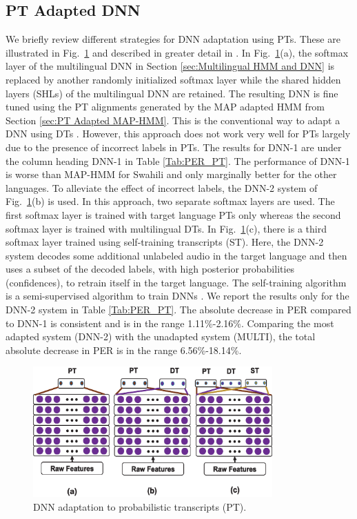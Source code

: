 \documentclass[a4paper]{article}
\newcommand{\myvspacefig}{\vspace{-4mm}}
\begin{document}
\subsection{PT Adapted DNN}
\label{sec:PT Adapted DNN}
We briefly review different strategies for DNN adaptation using PTs. These are illustrated in Fig.~\ref{fig:DNN} and described in greater detail in \cite{Das-PTAdaptedDNN}. In Fig.~\ref{fig:DNN}(a), the softmax layer of the multilingual DNN in Section \ref{sec:Multilingual HMM and DNN} is replaced by another randomly initialized softmax layer while the shared hidden layers (SHLs) of the multilingual DNN are retained. The resulting DNN is fine tuned using the PT alignments generated by the MAP adapted HMM from Section \ref{sec:PT Adapted MAP-HMM}. This is the conventional way to adapt a DNN using DTs \cite{Ghoshal-MultilingualPretraining}. However, this approach does not work very well for PTs largely due to the presence of incorrect labels in PTs. The results for DNN-1 are under the column heading DNN-1 in Table \ref{Tab:PER_PT}. The performance of DNN-1 is worse than MAP-HMM for Swahili and only marginally better for the other languages. To alleviate the effect of incorrect labels, the DNN-2 system of Fig.~\ref{fig:DNN}(b) is used. In this approach, two separate softmax layers are used. The first softmax layer is trained with target language PTs only whereas the second softmax layer is trained with multilingual DTs. In Fig.~\ref{fig:DNN}(c), there is a third softmax layer trained using self-training transcripts (ST). Here, the DNN-2 system decodes some additional unlabeled audio in the target language and then uses a subset of the decoded labels, with high posterior probabilities (confidences), to retrain itself in the target language. The self-training algorithm is a semi-supervised algorithm to train DNNs \cite{Vesely-SemisupTrainingDNN}. We report the results only for the DNN-2 system in Table \ref{Tab:PER_PT}. The absolute decrease in PER compared to DNN-1 is consistent and is in the range 1.11\%-2.16\%. Comparing the most adapted system (DNN-2) with the unadapted system (MULTI), the total absolute decrease in PER is in the range 6.56\%-18.14\%.



\begin{figure}
 \centering
 \includegraphics[width=\linewidth,height=5cm]{fig/DNN_multisoftmax.eps} 
 \caption{DNN adaptation to probabilistic transcripts (PT).}
 \myvspacefig
 \label{fig:DNN}
\end{figure}
\end{document}
